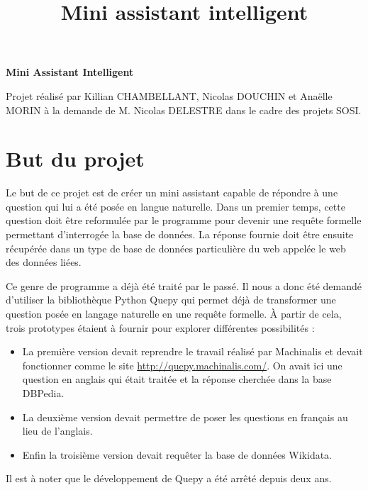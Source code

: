 \documentclass[11pt,a4paper]{article}
\title{Mini assistant intelligent}
\author{}
\begin{document}

\Huge
\begin{center}
  \bf Mini Assistant Intelligent
\end{center}
\normalsize
Projet réalisé par Killian CHAMBELLANT, Nicolas DOUCHIN et Anaëlle MORIN à la demande de M. Nicolas DELESTRE dans le cadre des projets SOSI.


\section*{But du projet}\par
Le but de ce projet est de créer un mini assistant capable de répondre à une question qui lui a été posée en langue naturelle. 
Dans un premier temps, cette question doit être reformulée par le programme pour devenir une requête formelle permettant d'interrogée la base de données. La réponse fournie doit être ensuite récupérée dans un type de base de données particulière du web appelée le web des données liées.\par 
Ce genre de programme a déjà été traité par le passé. Il nous a donc été demandé d'utiliser la bibliothèque Python Quepy qui permet déjà de transformer une question posée en langage naturelle en une requête formelle. À partir de cela, trois prototypes étaient à fournir pour explorer différentes possibilités : \par
\begin{itemize}
\item La première version devait reprendre le travail réalisé par Machinalis et devait fonctionner comme le site \url{http://quepy.machinalis.com/}. On avait ici une question en anglais qui était traitée et la réponse cherchée dans la base DBPedia.
\item La deuxième version devait permettre de poser les questions en français au lieu de l'anglais.
\item Enfin la troisième version devait requêter la base de données Wikidata.
\end{itemize}\par
Il est à noter que le développement de Quepy a été arrêté depuis deux ans.
\end{document}
